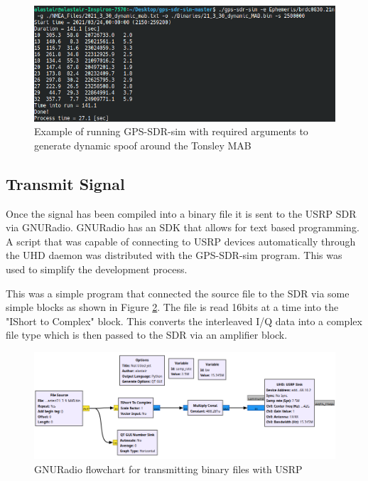 \begin{figure}[!ht]
    \begin{centering}
        \includegraphics[width=14cm,keepaspectratio]{Figures/gps-sdr-sim running.png}
        \caption{Example of running GPS-SDR-sim with required arguments to generate dynamic spoof around the Tonsley MAB}
    \label{fig:sdrsimexample}
    \end{centering}
\end{figure}

\subsection{Transmit Signal}
Once the signal has been compiled into a binary file it is sent to the USRP SDR via GNURadio. GNURadio has an SDK that allows for text based programming. A script that was
capable of connecting to USRP devices automatically through the UHD daemon was distributed with the GPS-SDR-sim program. This was used to simplify the development
process. 

This was a simple program that connected the source file to the SDR via some simple blocks as shown in Figure \ref{fig:GNURadioSpoof}. The file is read 16bits at a time
into the "IShort to Complex" block. This converts the interleaved I/Q data into a complex file type which is then passed to the SDR via an amplifier block.

\begin{figure}[!ht]
    \begin{centering}
        \includegraphics[width=14cm,keepaspectratio]{Figures/GNURadio_Spoofer.png}
        \caption{GNURadio flowchart for transmitting binary files with USRP}
    \label{fig:GNURadioSpoof}
    \end{centering}
\end{figure}


